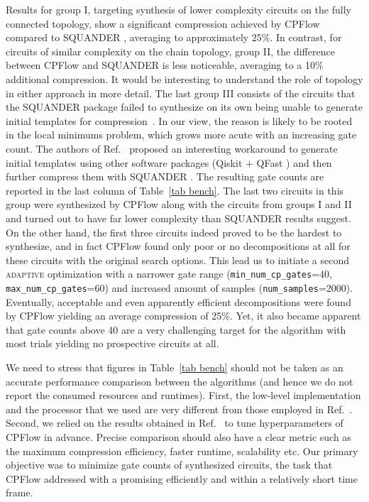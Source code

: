\documentclass[twocolumn, amsfonts, amssymb, aps, nofootinbib]{revtex4-2}
\newcommand{\package}[1]{\textrm {#1 }}
\newcommand{\cpflow}{\package{CPFlow}}
\newcommand{\adaptive}{\textsc{adaptive }}
\newcommand{\param}[1]{\texttt{#1}}
\begin{document}
Results for group I, targeting synthesis of lower complexity circuits on the fully connected  topology, show a significant compression achieved by \cpflow compared to \package{SQUANDER}, averaging to approximately 25\%. In contrast, for circuits of similar complexity on the chain topology, group II, the difference between \package{CPFlow} and \package{SQUANDER} is less noticeable, averaging to a 10\% additional compression. It would be interesting to understand the role of topology in either approach in more detail. The last group III consists of the circuits that the \package{SQUANDER} package failed to synthesize on its own being unable to generate initial templates for compression~\cite{Rakyta2022}. In our view, the reason is likely to be rooted in the local minimums problem, which grows more acute with an increasing gate count. The authors of Ref.~\cite{Rakyta2022} proposed an interesting workaround to generate initial templates using other software packages (\package{Qiskit}+ \package{QFast}) and then further compress them with \package{SQUANDER}. The resulting gate counts are reported in the last column of Table~\ref{tab bench}. The last two circuits in this group were synthesized by \cpflow along with  the circuits from groups I and II and turned out to have far lower complexity than \package{SQUANDER} results suggest. On the other hand, the first three circuits indeed proved to be the hardest to synthesize, and in fact \cpflow found only poor or no decompositions at all for these circuits with the original search options. This lead us to initiate a second \adaptive optimization with a narrower gate range (\param{min\_num\_cp\_gates}=40, \param{max\_num\_cp\_gates}=60) and increased amount of samples (\param{num\_samples}=2000). Eventually, acceptable and even apparently efficient decompositions were found by \cpflow yielding an average compression of 25\%. Yet, it also became apparent that gate counts above 40 are a very challenging target for the algorithm with most trials yielding no prospective circuits at all.

We need to stress that figures in Table~\ref{tab bench} should not be taken as an accurate performance comparison between the algorithms (and hence we do not report the consumed resources and runtimes). First, the low-level implementation and the processor that we used are very different from those employed in Ref.~\cite{Rakyta2022}. Second, we relied on the results obtained in Ref.~\cite{Rakyta2022} to tune hyperparameters of \cpflow in advance. Precise comparison should also have a clear metric such as the maximum compression efficiency, faster runtime, scalability etc. Our primary objective was to minimize gate counts of synthesized circuits, the task that \cpflow addressed with a promising efficiently and within a relatively short time frame.
\end{document}
